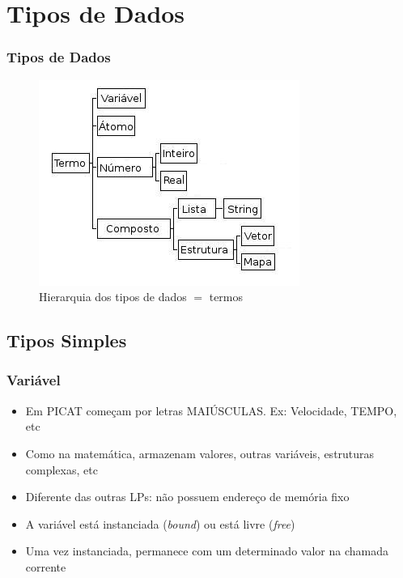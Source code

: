 \documentclass[10pt]{beamer}
\begin{document}
\section{Tipos de Dados}

\begin{frame}
\frametitle{Tipos de Dados}

\begin{figure}[!ht]
\centering
\includegraphics[width=.6\textwidth]{figures/tipos_dados_picat_traduzido.jpg}
\caption{Hierarquia dos tipos de dados $=$ termos}
\label{Hiera}
\end{figure}

\end{frame}

\subsection{Tipos Simples}
\begin{frame}
    \frametitle{Variável}
   
   \begin{itemize}
     \item Em PICAT começam por letras MAIÚSCULAS. Ex: Velocidade, TEMPO, etc
     \item Como na matemática, armazenam valores, outras variáveis, estruturas complexas, etc

     \item Diferente das outras LPs: não possuem endereço de memória fixo

     \item A variável está instanciada (\textit{bound}) ou está livre (\textit{free})
     \item Uma vez instanciada, permanece com um determinado valor na chamada corrente
     
   \end{itemize}
   
  
   
\end{frame}
\end{document}
